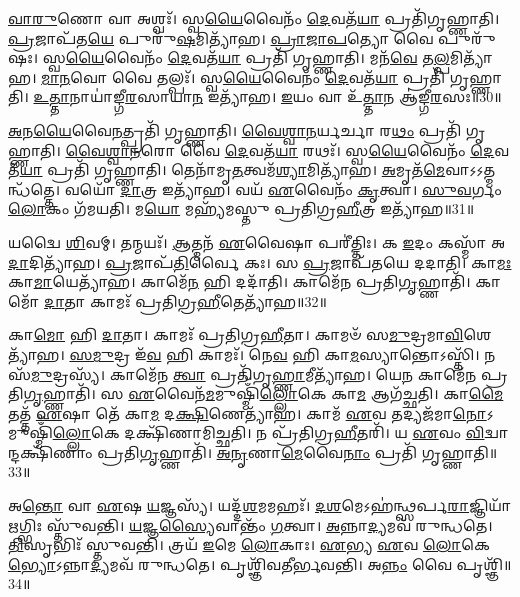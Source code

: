 \-\ul{𑌵𑌾}\-\-\ul{𑌰𑍁}\-𑌣𑍋 𑌵𑌾 𑌅𑌶𑍍𑌵𑌃᳴।
𑌸𑍍𑌵\-\ul{𑌯𑍈}\-𑌵𑍈𑌨𑌂᳴ \ul{𑌦𑍇}\-𑌵𑌤᳴\-\ul{𑌯𑌾} 𑌪𑍍𑌰𑌤𑌿᳴\-𑌗𑍃𑌹𑍍𑌣𑌾𑌤𑌿।
\-\ul{𑌪𑍍𑌰}\-𑌜𑌾𑌪᳴𑌤\-\ul{𑌯𑍇} 𑌪𑍁𑌰𑍁᳴\-\ul{𑌷}\-𑌮𑌿𑌤𑍍𑌯𑌾᳴𑌹।
\-\ul{𑌪𑍍𑌰𑌾}\-\-\ul{𑌜𑌾}\-\-\ul{𑌪}\-𑌤𑍍𑌯𑍋 𑌵𑍈 𑌪𑍁𑌰𑍁᳴𑌷𑌃।
𑌸𑍍𑌵\-\ul{𑌯𑍈}\-𑌵𑍈𑌨𑌂᳴ \ul{𑌦𑍇}\-𑌵𑌤᳴\-\ul{𑌯𑌾} 𑌪𑍍𑌰𑌤𑌿᳴ 𑌗𑍃𑌹𑍍𑌣𑌾𑌤𑌿।
𑌮𑌨᳴\-\ul{𑌵𑍇} 𑌤\-\ul{𑌲𑍍𑌪}\-𑌮𑌿𑌤𑍍𑌯𑌾᳴𑌹।
\-\ul{𑌮𑌾}\-\-\ul{𑌨}\-𑌵𑍋 𑌵𑍈 𑌤𑌲𑍍𑌪𑌃᳴।
𑌸𑍍𑌵\-\ul{𑌯𑍈}\-𑌵𑍈𑌨𑌂᳴ \ul{𑌦𑍇}\-𑌵𑌤᳴\-\ul{𑌯𑌾} 𑌪𑍍𑌰𑌤𑌿᳴ 𑌗𑍃𑌹𑍍𑌣𑌾𑌤𑌿।
\-\ul{𑌉}\-\-\ul{𑌤𑍍𑌤𑌾}\-𑌨𑌾𑌯𑌾॑𑌙𑍍𑌗𑍀\-\ul{𑌰}\-𑌸𑌾𑌯𑌾\-\ul{𑌨} 𑌇𑌤𑍍𑌯𑌾᳴𑌹।
\-\ul{𑌇}\-𑌯𑌂 𑌵𑌾 𑌉᳴\-\ul{𑌤𑍍𑌤𑌾}\-𑌨 𑌆॑𑌙𑍍𑌗𑍀\-\ul{𑌰}\-𑌸𑌃॥30॥

\-\ul{𑌅}\-𑌨\-\ul{𑌯𑍈}\-𑌵𑍈\-\ul{𑌨}\-𑌤𑍍𑌪𑍍𑌰𑌤𑌿᳴ 𑌗𑍃𑌹𑍍𑌣𑌾𑌤𑌿।
\-\ul{𑌵𑍈}\-\-\ul{𑌶𑍍𑌵𑌾}\-\-\ul{𑌨}\-𑌰𑍍𑌯𑌰𑍍𑌚𑌾 𑌰\-\ul{𑌥𑌂} 𑌪𑍍𑌰𑌤𑌿᳴ 𑌗𑍃𑌹𑍍𑌣𑌾𑌤𑌿।
\-\ul{𑌵𑍈}\-\-\ul{𑌶𑍍𑌵𑌾}\-\-\ul{𑌨}\-𑌰𑍋 𑌵𑍈 \ul{𑌦𑍇}\-𑌵𑌤᳴\-\ul{𑌯𑌾} 𑌰𑌥𑌃᳴।
𑌸𑍍𑌵\-\ul{𑌯𑍈}\-𑌵𑍈𑌨𑌂᳴ \ul{𑌦𑍇}\-𑌵𑌤᳴\-\ul{𑌯𑌾} 𑌪𑍍𑌰𑌤𑌿᳴ 𑌗𑍃𑌹𑍍𑌣𑌾𑌤𑌿।
𑌤𑍇𑌨𑌾᳴𑌮𑍃\-\ul{𑌤}\-𑌤𑍍𑌵𑌮᳴\-\ul{𑌶𑍍𑌯𑌾}\-𑌮𑌿𑌤𑍍𑌯𑌾᳴𑌹।
\-\ul{𑌅}\-𑌮𑍃𑌤᳴\-\ul{𑌮𑍇}\-𑌵𑌾𑌽𑌽𑌤𑍍𑌮𑌨𑍍𑌧᳴𑌤𑍍𑌤𑍇।
𑌵𑌯𑍋᳴ \ul{𑌦𑌾}\-𑌤𑍍𑌰 𑌇𑌤𑍍𑌯𑌾᳴𑌹।
𑌵𑌯᳴ \ul{𑌏}\-𑌵𑍈𑌨𑌂᳴ \ul{𑌕𑍃}\-𑌤𑍍𑌵𑌾।
\-\ul{𑌸𑍁}\-\-\ul{𑌵}\-𑌰𑍍𑌗𑌂 \ul{𑌲𑍋}\-𑌕𑌂 𑌗᳴𑌮𑌯𑌤𑌿।
𑌮\-\ul{𑌯𑍋} 𑌮𑌹𑍍𑌯᳴𑌮𑌸𑍍𑌤𑍁 𑌪𑍍𑌰𑌤𑌿𑌗𑍍𑌰\-\ul{𑌹𑍀}\-𑌤𑍍𑌰 𑌇𑌤𑍍𑌯𑌾᳴𑌹॥31॥

𑌯𑌦𑍍𑌵𑍈 \ul{𑌶𑌿}\-𑌵𑌮𑍍।
𑌤𑌨𑍍𑌮𑌯𑌃᳴।
\-\ul{𑌆}\-𑌤𑍍𑌮𑌨᳴ \ul{𑌏}\-𑌵𑍈𑌷𑌾 𑌪𑌰𑍀॑𑌤𑍍𑌤𑌿𑌃।
𑌕 \ul{𑌇}\-𑌦𑌂 𑌕𑌸𑍍𑌮𑌾᳴ 𑌅\-\ul{𑌦𑌾}\-𑌦𑌿𑌤𑍍𑌯𑌾᳴𑌹।
\-\ul{𑌪𑍍𑌰}\-𑌜𑌾𑌪᳴\-\ul{𑌤𑌿}\-𑌰𑍍𑌵𑍈 𑌕𑌃।
𑌸 \ul{𑌪𑍍𑌰}\-𑌜𑌾𑌪᳴𑌤𑌯𑍇 𑌦𑌦𑌾𑌤𑌿।
𑌕𑌾\-\ul{𑌮𑌃} 𑌕𑌾\-\ul{𑌮𑌾}\-𑌯𑍇𑌤𑍍𑌯𑌾᳴𑌹।
𑌕𑌾𑌮𑍇᳴\-\ul{𑌨} 𑌹𑌿 𑌦𑌦𑌾᳴𑌤𑌿।
𑌕𑌾𑌮𑍇᳴𑌨 𑌪𑍍𑌰𑌤𑌿\-\ul{𑌗𑍃}\-𑌹𑍍𑌣𑌾𑌤𑌿᳴।
𑌕𑌾𑌮𑍋᳴ \ul{𑌦𑌾}\-𑌤𑌾 𑌕𑌾𑌮𑌃᳴ 𑌪𑍍𑌰𑌤𑌿𑌗𑍍𑌰\-\ul{𑌹𑍀}\-𑌤𑍇𑌤𑍍𑌯𑌾᳴𑌹॥32॥

𑌕𑌾\-\ul{𑌮𑍋} 𑌹𑌿 \ul{𑌦𑌾}\-𑌤𑌾।
𑌕𑌾𑌮𑌃᳴ 𑌪𑍍𑌰𑌤𑌿𑌗𑍍𑌰\-\ul{𑌹𑍀}\-𑌤𑌾।
𑌕𑌾𑌮𑍞᳴ 𑌸\-\ul{𑌮𑍁}\-𑌦𑍍𑌰𑌮𑌾\-\ul{𑌵𑌿}\-𑌶𑍇\-𑌤𑍍𑌯𑌾᳴𑌹।
\-\ul{𑌸}\-\-\ul{𑌮𑍁}\-𑌦𑍍𑌰 𑌇᳴\-\ul{𑌵} 𑌹𑌿 𑌕𑌾𑌮𑌃᳴।
𑌨𑍇\-\ul{𑌵} 𑌹𑌿 𑌕𑌾\-\ul{𑌮}\-𑌸𑍍𑌯𑌾𑌨𑍍𑌤𑍋\-𑌽𑌸𑍍𑌤𑌿᳴।
𑌨 𑌸᳴\-\ul{𑌮𑍁}\-𑌦𑍍𑌰𑌸𑍍𑌯᳴।
𑌕𑌾𑌮𑍇᳴𑌨 \ul{𑌤𑍍𑌵𑌾} 𑌪𑍍𑌰𑌤𑌿᳴\-𑌗𑍃\-\ul{𑌹𑍍𑌣𑌾}\-𑌮𑍀𑌤𑍍𑌯𑌾᳴𑌹।
𑌯𑍇\-\ul{𑌨} 𑌕𑌾𑌮𑍇᳴𑌨 𑌪𑍍𑌰𑌤𑌿\-\ul{𑌗𑍃}\-𑌹𑍍𑌣𑌾𑌤𑌿᳴।
𑌸 \ul{𑌏}\-𑌵𑍈𑌨᳴\-\ul{𑌮}\-𑌮𑍁𑌷𑍍𑌮𑌿𑌁᳴\-\ul{𑌲𑍍𑌲𑍋}\-𑌕𑍇 𑌕𑌾\-\ul{𑌮} 𑌆𑌗᳴𑌚𑍍𑌛𑌤𑌿।
𑌕𑌾\-\ul{𑌮𑍈}\-𑌤𑌤𑍍𑌤᳴ \ul{𑌏}\-𑌷𑌾 𑌤𑍇᳴ 𑌕𑌾\-\ul{𑌮} 𑌦\-\ul{𑌕𑍍𑌷𑌿}\-𑌣𑍇𑌤𑍍𑌯𑌾᳴𑌹।
𑌕𑌾𑌮᳴ \ul{𑌏}\-𑌵 𑌤𑌦𑍍𑌯𑌜᳴𑌮𑌾\-\ul{𑌨𑍋}\-\-𑌽𑌮𑍁𑌷𑍍𑌮𑌿𑌁᳴\-\ul{𑌲𑍍𑌲𑍋}\-𑌕𑍇 𑌦𑌕𑍍𑌷𑌿᳴𑌣𑌾𑌮𑌿𑌚𑍍𑌛𑌤𑌿।
𑌨 𑌪𑍍𑌰᳴𑌤𑌿𑌗𑍍𑌰\-\ul{𑌹𑍀}\-𑌤𑌰𑌿᳴।
𑌯 \ul{𑌏}\-𑌵𑌂 \ul{𑌵𑌿}\-𑌦𑍍𑌵𑌾𑌨𑍍𑌦𑌕𑍍𑌷𑌿᳴𑌣𑌾𑌂 𑌪𑍍𑌰𑌤𑌿\-\ul{𑌗𑍃}\-𑌹𑍍𑌣𑌾𑌤𑌿᳴।
\-\ul{𑌅}\-\-\ul{𑌨𑍃}\-𑌣𑌾\-\ul{𑌮𑍇}\-𑌵𑍈\-\ul{𑌨𑌾𑌂} 𑌪𑍍𑌰𑌤𑌿᳴ 𑌗𑍃𑌹𑍍𑌣𑌾𑌤𑌿॥33॥\anuvakamend[\-\ul{𑌵𑍍𑌲𑍀}\-\-\ul{𑌨𑌾}\-𑌤𑍍𑌯\-\ul{𑌶𑍍𑌵}\-𑌮𑌿𑌤𑍍𑌯𑌾᳴𑌹𑌾𑌙𑍍𑌗𑍀\-\ul{𑌰}\-𑌸𑌃 𑌪𑍍𑌰᳴𑌤𑌿𑌗𑍍𑌰\-\ul{𑌹𑍀}\-𑌤𑍍𑌰 𑌇𑌤𑍍𑌯𑌾᳴𑌹 𑌪𑍍𑌰𑌤𑌿𑌗𑍍𑌰\-\ul{𑌹𑍀}\-𑌤𑍇𑌤𑍍𑌯𑌾᳴\-\ul{𑌹} 𑌦\-\ul{𑌕𑍍𑌷𑌿}\-𑌣𑍇𑌤𑍍𑌯𑌾᳴𑌹 \ul{𑌚}\-𑌤𑍍𑌵𑌾𑌰𑌿᳴ 𑌚]

𑌅\-\ul{𑌨𑍍𑌤𑍋} 𑌵𑌾 \ul{𑌏}\-𑌷 \ul{𑌯}\-𑌜𑍍𑌞𑌸𑍍𑌯᳴।
𑌯𑌦𑍍𑌦᳴\-\ul{𑌶}\-𑌮𑌮𑌹𑌃᳴।
\-\ul{𑌦}\-\-\ul{𑌶}\-𑌮𑍇\-𑌽𑌹॑𑌨𑍍𑌥𑍍𑌸𑌰𑍍𑌪\-\ul{𑌰𑌾}\-𑌜𑍍𑌞𑌿𑌯𑌾᳴ \ul{𑌋}\-𑌗𑍍𑌭𑌿𑌃 𑌸𑍍𑌤𑍁᳴𑌵𑌨𑍍𑌤𑌿।
\-\ul{𑌯}\-𑌜𑍍𑌞\-\ul{𑌸𑍍𑌯𑍈}\-𑌵𑌾𑌨𑍍𑌤𑌂᳴ \ul{𑌗}\-𑌤𑍍𑌵𑌾।
\-\ul{𑌅}\-𑌨𑍍𑌨𑌾\-\ul{𑌦𑍍𑌯}\-𑌮𑌵᳴ 𑌰𑍁𑌨𑍍𑌧𑌤𑍇।
\-\ul{𑌤𑌿}\-𑌸𑍃𑌭𑌿𑌃᳴ 𑌸𑍍𑌤𑍁𑌵𑌨𑍍𑌤𑌿।
𑌤𑍍𑌰𑌯᳴ \ul{𑌇}\-𑌮𑍇 \ul{𑌲𑍋}\-𑌕𑌾𑌃।
\-\ul{𑌏}\-𑌭𑍍𑌯 \ul{𑌏}\-𑌵 \ul{𑌲𑍋}\-𑌕𑍇\-\ul{𑌭𑍍𑌯𑍋}\-\-𑌽𑌨𑍍𑌨𑌾\-\ul{𑌦𑍍𑌯}\-𑌮𑌵᳴ 𑌰𑍁𑌨𑍍𑌧𑌤𑍇।
𑌪𑍃𑌶𑍍𑌞𑌿᳴𑌵𑌤𑍀𑌰𑍍𑌭𑌵𑌨𑍍𑌤𑌿।
𑌅\-\ul{𑌨𑍍𑌨𑌂} 𑌵𑍈 𑌪𑍃𑌶𑍍𑌞𑌿᳴॥34॥

